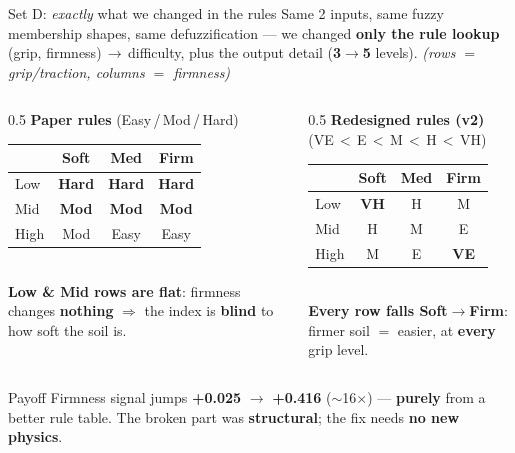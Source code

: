 \documentclass[aspectratio=169]{beamer}
\newcommand{\good}[1]{\textcolor{green!55!black}{\textbf{#1}}}
\newcommand{\bad}[1]{\textcolor{red!70!black}{\textbf{#1}}}
\begin{document}
\begin{frame}{Set D: \emph{exactly} what we changed in the rules}
  Same 2 inputs, same fuzzy membership shapes, same defuzzification --- we changed \textbf{only
  the rule lookup} (grip, firmness)$\,\to\,$difficulty, plus the output detail (\textbf{3$\to$5} levels).
  \footnotesize\textit{(rows $=$ grip/traction, columns $=$ firmness)}\normalsize
  \vspace{3pt}
  \begin{columns}[t]
    \begin{column}{0.5\textwidth}
      \centering
      \bad{Paper rules} \;\scriptsize(Easy\,/\,Mod\,/\,Hard)\normalsize\\[3pt]
      \renewcommand{\arraystretch}{1.3}\small
      \begin{tabular}{@{}l|ccc@{}}
         & Soft & Med & Firm \\ \midrule
        Low  & \bad{Hard} & \bad{Hard} & \bad{Hard} \\
        Mid  & \bad{Mod}  & \bad{Mod}  & \bad{Mod}  \\
        High & Mod  & Easy & Easy \\
      \end{tabular}\\[5pt]
      \footnotesize \bad{Low \& Mid rows are flat}: firmness changes \textbf{nothing} $\Rightarrow$
      the index is \textbf{blind} to how soft the soil is.
    \end{column}
    \begin{column}{0.5\textwidth}
      \centering
      \good{Redesigned rules (v2)} \;\scriptsize(VE\,$<$\,E\,$<$\,M\,$<$\,H\,$<$\,VH)\normalsize\\[3pt]
      \renewcommand{\arraystretch}{1.3}\small
      \begin{tabular}{@{}l|ccc@{}}
         & Soft & Med & Firm \\ \midrule
        Low  & \bad{VH} & H & M  \\
        Mid  & H  & M & E  \\
        High & M  & E & \good{VE} \\
      \end{tabular}\\[5pt]
      \footnotesize \good{Every row falls Soft$\to$Firm}: firmer soil $=$ easier, at
      \textbf{every} grip level.
    \end{column}
  \end{columns}
  \vspace{3pt}
  \begin{block}{Payoff}
    Firmness signal jumps \bad{+0.025} $\to$ \good{+0.416} ($\sim$16$\times$) --- \textbf{purely}
    from a better rule table. The broken part was \textbf{structural}; the fix needs \textbf{no new physics}.
  \end{block}
\end{frame}
\end{document}
